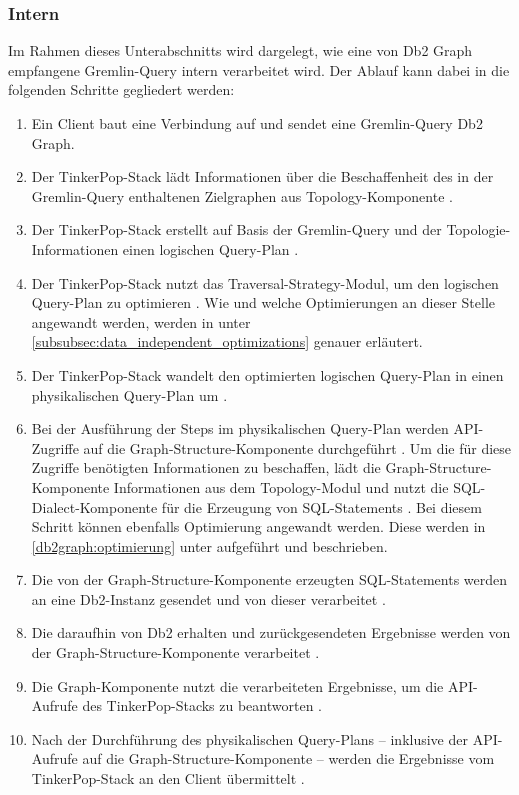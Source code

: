 \subsubsection{Intern}
Im Rahmen dieses Unterabschnitts wird dargelegt, wie eine von Db2 Graph empfangene Gremlin-Query intern verarbeitet wird. Der Ablauf kann dabei in die folgenden Schritte gegliedert werden: 

\begin{enumerate}
    \item Ein Client baut eine Verbindung auf und sendet eine Gremlin-Query Db2 Graph.
    \item Der TinkerPop-Stack lädt Informationen über die Beschaffenheit des in der Gremlin-Query enthaltenen Zielgraphen aus Topology-Komponente \cite{vldb_tian,sigmod_tian, yt_tian}.
    \item Der TinkerPop-Stack erstellt auf Basis der Gremlin-Query und der Topologie-Informationen einen logischen Query-Plan \cite{vldb_tian,sigmod_tian, yt_tian}. 
    \item Der TinkerPop-Stack nutzt das Traversal-Strategy-Modul, um den logischen Query-Plan zu optimieren \cite{vldb_tian,sigmod_tian, yt_tian}. Wie und welche Optimierungen an dieser Stelle angewandt werden, werden in  unter \autoref{subsubsec:data_independent_optimizations} genauer erläutert.
    \item Der TinkerPop-Stack wandelt den optimierten logischen Query-Plan in einen physikalischen Query-Plan um \cite{vldb_tian,sigmod_tian, yt_tian}. 
    \item Bei der Ausführung der Steps im physikalischen Query-Plan werden API-Zugriffe auf die Graph-Structure-Komponente durchgeführt \cite{vldb_tian,sigmod_tian, yt_tian}. Um die für diese Zugriffe benötigten Informationen zu beschaffen, lädt die Graph-Structure-Komponente Informationen aus dem Topology-Modul und nutzt die SQL-Dialect-Komponente für die Erzeugung von SQL-Statements \cite{vldb_tian,sigmod_tian, yt_tian}. Bei diesem Schritt können ebenfalls Optimierung angewandt werden. Diese werden in \autoref{db2graph:optimierung} unter  aufgeführt und beschrieben.
    \item Die von der Graph-Structure-Komponente erzeugten SQL-Statements werden an eine Db2-Instanz gesendet und von dieser verarbeitet \cite{vldb_tian,sigmod_tian, yt_tian}.
    \item Die daraufhin von Db2 erhalten und zurückgesendeten Ergebnisse werden von der Graph-Structure-Komponente verarbeitet \cite{yt_tian}. 
    \item Die Graph-Komponente nutzt die verarbeiteten Ergebnisse, um die API-Aufrufe des TinkerPop-Stacks zu beantworten \cite{vldb_tian,sigmod_tian, yt_tian}.
    \item Nach der Durchführung des physikalischen Query-Plans -- inklusive der API-Aufrufe auf die Graph-Structure-Komponente -- werden die Ergebnisse vom TinkerPop-Stack an den Client übermittelt \cite{vldb_tian,sigmod_tian, yt_tian}.
\end{enumerate}

